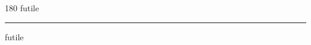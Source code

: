
\begin{frame}
\begin{center}
\begin{turn}{180}
{\fontsize{2.5cm}{1em}\selectfont futile}
\end{turn}
\vspace{1em}\par  
\hrule
\vspace{1em}\par  
{\fontsize{2.5cm}{1em}\selectfont futile}
\end{center}
\end{frame}
